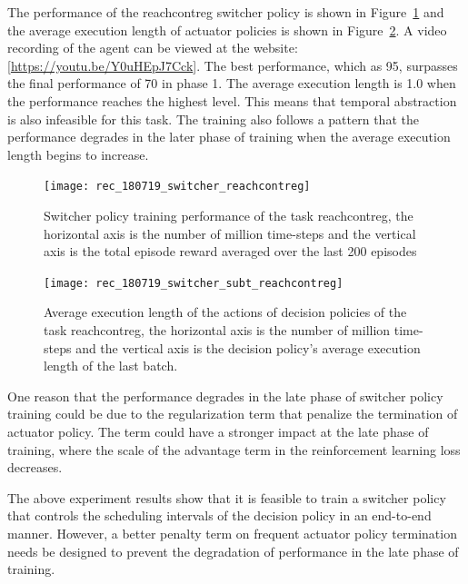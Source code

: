 The performance of the reachcontreg switcher policy is shown in Figure~\ref{rec_switcher_reachcontreg} and the average execution length of actuator policies is shown in Figure~\ref{rec_switcher_subt_reachcontreg}. A video recording of the agent can be viewed at the website:  [\url{https://youtu.be/Y0uHEpJ7Cck}]. The best performance, which as 95, surpasses the final performance of 70 in phase 1. The average execution length is 1.0 when the performance reaches the highest level. This means that temporal abstraction is also infeasible for this task. The training also follows a pattern that the performance degrades in the later phase of training when the average execution length begins to increase.
\begin{figure}[!htbp]
	\centering
	\texttt{[image: rec\_180719\_switcher\_reachcontreg]}
	\caption{Switcher policy training performance of the task reachcontreg, the horizontal axis is the number of million time-steps and the vertical axis is the total episode reward averaged over the last 200 episodes}
	\label{rec_switcher_reachcontreg}
\end{figure}

\begin{figure}[!htbp]
	\centering
	\texttt{[image: rec\_180719\_switcher\_subt\_reachcontreg]}
	\caption{Average execution length of the actions of decision policies of the task reachcontreg, the horizontal axis is the number of million time-steps and the vertical axis is the decision policy's average execution length of the last batch.}
	\label{rec_switcher_subt_reachcontreg}
\end{figure}

One reason that the performance degrades in the late phase of switcher policy training could be due to the regularization term that penalize the termination of actuator policy. The term could have a stronger impact at the late phase of training, where the scale of the advantage term in the reinforcement learning loss decreases.

The above experiment results show that it is feasible to train a switcher policy that controls the scheduling intervals of the decision policy in an end-to-end manner. However, a better penalty term on frequent actuator policy termination needs be designed to prevent the degradation of performance in the late phase of training. 